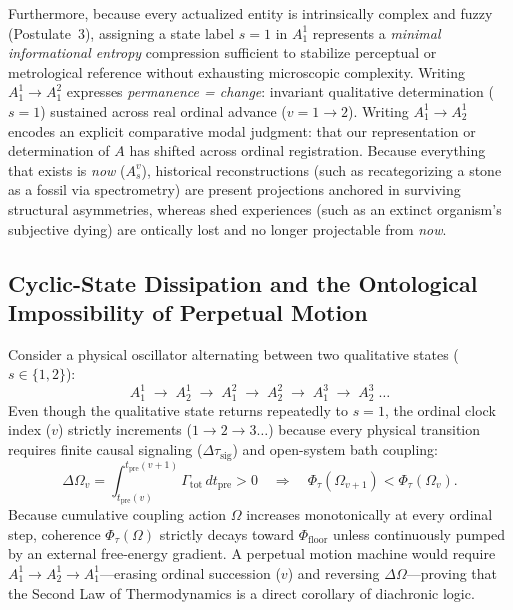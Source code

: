 \documentclass[11pt,a4paper]{article}
\begin{document}
Furthermore, because every actualized entity is intrinsically complex and fuzzy (Postulate~3), assigning a state label $s = 1$ in $A_1^1$ represents a \emph{minimal informational entropy} compression sufficient to stabilize perceptual or metrological reference without exhausting microscopic complexity. Writing $A_1^1 \to A_1^2$ expresses \emph{permanence = change}: invariant qualitative determination ($s = 1$) sustained across real ordinal advance ($v = 1 \to 2$). Writing $A_1^1 \to A_2^1$ encodes an explicit comparative modal judgment: that our representation or determination of $A$ has shifted across ordinal registration. Because everything that exists is \emph{now} ($A_s^v$), historical reconstructions (such as recategorizing a stone as a fossil via spectrometry) are present projections anchored in surviving structural asymmetries, whereas shed experiences (such as an extinct organism's subjective dying) are ontically lost and no longer projectable from \emph{now}.

\subsection{Cyclic-State Dissipation and the Ontological Impossibility of Perpetual Motion}

Consider a physical oscillator alternating between two qualitative states ($s \in \{1, 2\}$):
\begin{equation}
A_1^1 \;\longrightarrow\; A_2^1 \;\longrightarrow\; A_1^2 \;\longrightarrow\; A_2^2 \;\longrightarrow\; A_1^3 \;\longrightarrow\; A_2^3 \;\dots
\end{equation}
Even though the qualitative state returns repeatedly to $s = 1$, the ordinal clock index ($v$) strictly increments ($1 \to 2 \to 3 \dots$) because every physical transition requires finite causal signaling ($\Delta\tau_{\mathrm{sig}}$) and open-system bath coupling:
\begin{equation}
\Delta\Omega_v = \int_{t_{\mathrm{pre}}(v)}^{t_{\mathrm{pre}}(v+1)} \Gamma_{\mathrm{tot}} \, dt_{\mathrm{pre}} > 0 \quad \Longrightarrow \quad \Phi_\tau(\Omega_{v+1}) < \Phi_\tau(\Omega_v).
\end{equation}
Because cumulative coupling action $\Omega$ increases monotonically at every ordinal step, coherence $\Phi_\tau(\Omega)$ strictly decays toward $\Phi_{\mathrm{floor}}$ unless continuously pumped by an external free-energy gradient. A perpetual motion machine would require $A_1^1 \to A_2^1 \to A_1^1$---erasing ordinal succession ($v$) and reversing $\Delta\Omega$---proving that the Second Law of Thermodynamics is a direct corollary of diachronic logic.
\end{document}
